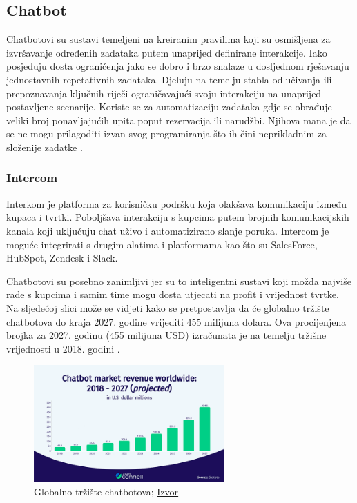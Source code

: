 \documentclass[]{foi}
\begin{document}
\subsection{Chatbot}

Chatbotovi su sustavi temeljeni na kreiranim pravilima koji su osmišljena za izvršavanje određenih zadataka putem unaprijed definirane interakcije. Iako posjeduju dosta ograničenja jako se dobro
i brzo snalaze u dosljednom rješavanju jednostavnih repetativnih zadataka. Djeluju na temelju stabla odlučivanja ili prepoznavanja ključnih riječi ograničavajući svoju interakciju na unaprijed 
postavljene scenarije. Koriste se za automatizaciju zadataka gdje se obrađuje veliki broj ponavljajućih upita poput rezervacija ili narudžbi. Njihova mana je da se ne mogu prilagoditi izvan
svog programiranja što ih čini neprikladnim za složenije zadatke \cite{exomindset2025difference}.

\subsubsection{Intercom}
Interkom je platforma za korisničku podršku koja olakšava komunikaciju između kupaca i tvrtki. Poboljšava interakciju s kupcima putem brojnih komunikacijskih kanala koji uključuju
chat uživo i automatizirano slanje poruka. Intercom je moguće integrirati s drugim alatima i platformama kao što su SalesForce, HubSpot, Zendesk i Slack.

Chatbotovi su posebno zanimljivi jer su to inteligentni sustavi koji možda najviše rade s kupcima i samim time mogu dosta utjecati na profit i vrijednost tvrtke. Na sljedećoj slici može
se vidjeti kako se pretpostavlja da će globalno tržište chatbotova do kraja 2027. godine vrijediti 455 milijuna dolara. Ova procijenjena brojka za 2027. godinu (455 milijuna USD) izračunata
je na temelju tržišne vrijednosti u 2018. godini \cite{connell2025chatbot}. 

\begin{figure}[ht!]
    \centering
    \includegraphics[width=0.65\textwidth]{./assets/chatbots.png} 
    \caption{Globalno tržište chatbotova; \href{https://adamconnell.me/wp-content/uploads/01-Chatbot-market-revenue.png}{Izvor}}
    \label{fig:slika3011}
\end{figure}
\end{document}
